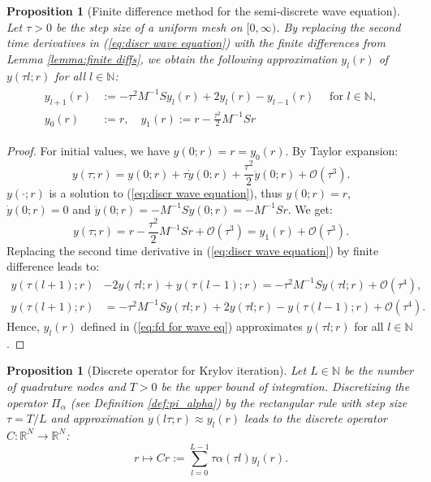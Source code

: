 \documentclass[a4paper,11pt,bibliography=totoc,listof=totoc,headinclude=true,cleardoublepage=empty,oneside]{scrbook}
\newtheorem{prop}[theorem]{Proposition}
\newcommand{\R}{\mathbb{R}}
\newcommand{\N}{\mathbb{N}}
\newcommand{\bigO}{\mathcal{O}}
\renewcommand{\eqref}[1]{(\ref{#1})}
\begin{document}
\begin{prop}[Finite difference method for the semi-discrete wave equation]
    Let $\tau>0$ be the step size of a uniform mesh on $[0, \infty)$. By replacing the second time derivatives in \eqref{eq:discr wave equation} with the finite differences from Lemma \ref{lemma:finite diffs}, we obtain the following approximation $y_l(r)$ of $y(\tau l; r)$ for all $l \in \N$:
    \begin{align}\label{eq:fd for wave eq}
    \begin{split}
        y_{l+1}(r) &:= -\tau^2M^{-1}S y_l(r) + 2y_l(r) - y_{l-1}(r) \quad \text{ for } l \in \N, \\
        y_0(r) &:= r, \quad y_1(r) := r - \frac{\tau^2}{2}M^{-1}Sr
    \end{split}
    \end{align}
\end{prop}
\begin{proof}
    For initial values, we have $y(0; r) = r = y_0(r)$. By Taylor expansion:
    \begin{equation*}
        y(\tau; r) = y(0; r) + \tau \dot{y}(0; r) + \frac{\tau^2}{2} \ddot{y}(0; r) + \bigO(\tau^3) .
    \end{equation*} 
    $y(\cdot; r)$ is a solution to \eqref{eq:discr wave equation}, thus $y(0; r) = r$, $\dot{y}(0; r) = 0$ and $\ddot{y}(0; r) = -M^{-1}Sy(0; r) = -M^{-1}Sr$. We get:
    \begin{equation*}
        y(\tau; r) = r - \frac{\tau^2}{2} M^{-1}Sr + \bigO(\tau^3) = y_{1}(r) + \bigO(\tau^3).
    \end{equation*}
    Replacing the second time derivative in \eqref{eq:discr wave equation} by finite difference leads to:
    \begin{align*}
        y(\tau(l+1); r) &- 2 y(\tau l; r) + y(\tau(l-1); r) = -\tau^2 M^{-1}S y(\tau l; r) + \bigO(\tau^4), \\
        y(\tau(l+1); r) &= -\tau^2 M^{-1}S y(\tau l; r) + 2y(\tau l; r) - y(\tau (l-1); r) + \bigO(\tau^4).
    \end{align*}
    Hence, $y_l(r)$ defined in \eqref{eq:fd for wave eq} approximates $y(\tau l; r)$ for all $l \in \N$.
\end{proof}

\begin{prop}[Discrete operator for Krylov iteration]\label{prop:C operator}
    Let $L \in \N$ be the number of quadrature nodes and $T>0$ be the upper bound of integration. Discretizing the operator $\Pi_\alpha$ (see Definition \ref{def:pi_alpha}) by the rectangular rule with step size $\tau = T/L$ and approximation $y(l\tau; r) \approx y_l(r)$ leads to the discrete operator $C : \R^N \rightarrow \R^N$:
    \begin{equation}\label{eq:C operator}
        r \mapsto Cr := \sum_{l=0}^{L-1} \tau \alpha(\tau l) y_l(r).
    \end{equation}
\end{prop}
\end{document}
